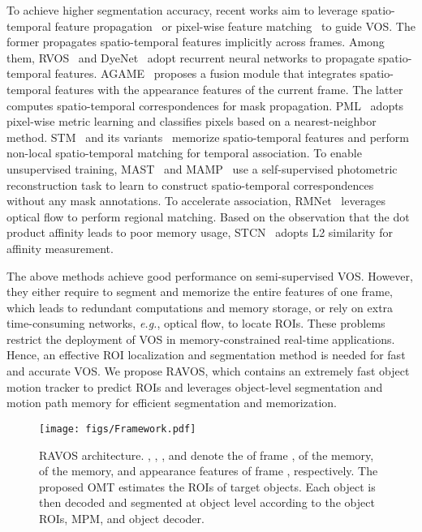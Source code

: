\documentclass[journal]{IEEEtran}
\def\eg{\emph{e.g.}}
\begin{document}
To achieve higher segmentation accuracy, recent works aim to leverage spatio-temporal feature propagation~\cite{PLM,RGMP,FSNet,G-FRTM,CapsuleVOS} or pixel-wise feature matching~\cite{PML,RaNet,VideoMatch,TVOS,SSTVOS,CFBI,LCM} to guide VOS. The former propagates spatio-temporal features implicitly across frames. Among them, RVOS~\cite{RVOS} and DyeNet~\cite{DyeNet} adopt recurrent neural networks to propagate spatio-temporal features. AGAME~\cite{A_GAME} proposes a fusion module that integrates spatio-temporal features with the appearance features of the current frame. 
The latter computes spatio-temporal correspondences for mask propagation.
PML~\cite{PML} adopts pixel-wise metric learning and classifies pixels based on a nearest-neighbor method.
STM~\cite{STM} and its variants~\cite{AFB_URR,GC} memorize spatio-temporal features and perform non-local spatio-temporal matching for temporal association. To enable unsupervised training, MAST~\cite{MAST} and MAMP~\cite{MAMP} use a self-supervised photometric reconstruction task to learn to construct spatio-temporal correspondences without any mask annotations. To accelerate association, RMNet~\cite{RMNet} leverages optical flow to perform regional matching. Based on the observation that the dot product affinity leads to poor memory usage, STCN~\cite{STCN} adopts L2 similarity for affinity measurement. 

The above methods achieve good performance on semi-supervised VOS. However, they either require to segment and memorize the entire features of one frame, which leads to redundant computations and memory storage, or rely on extra time-consuming networks, \eg, optical flow, to locate ROIs. These problems restrict the deployment of VOS in memory-constrained real-time applications. Hence, an effective ROI localization and segmentation method is needed for fast and accurate VOS. We propose RAVOS, which contains an extremely fast object motion tracker to predict ROIs and leverages object-level segmentation and motion path memory for efficient segmentation and memorization.


\begin{figure*}[t]
\centering
\texttt{[image: figs/Framework.pdf]}
\caption{RAVOS architecture. , , , and  denote the  of frame ,  of the memory,  of the memory, and appearance features of frame , respectively. The proposed OMT estimates the ROIs of target objects. Each object is then decoded and segmented at object level according to the object ROIs, MPM, and object decoder.} \label{fig:framework}
\end{figure*}
\end{document}
